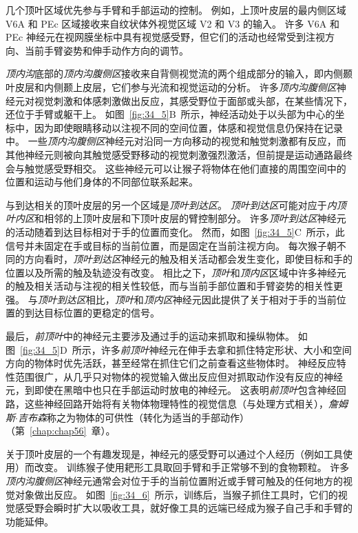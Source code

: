 几个顶叶区域优先参与手臂和手部运动的控制。
例如，上顶叶皮层的最内侧区域 V6A 和 PEc 区域接收来自纹状体外视觉区域 V2 和 V3 的输入。
许多 V6A 和 PEc 神经元在视网膜坐标中具有视觉感受野，但它们的活动也经常受到注视方向、当前手臂姿势和伸手动作方向的调节。


\textit{顶内沟}底部的\textit{顶内沟腹侧区}接收来自背侧视觉流的两个组成部分的输入，即内侧颞叶皮层和内侧颞上皮层，它们参与光流和视觉运动的分析。
许多\textit{顶内沟腹侧区}神经元对视觉刺激和体感刺激做出反应，其感受野位于面部或头部，在某些情况下，还位于手臂或躯干上。
如图~\ref{fig:34_5}B~所示，神经活动处于以头部为中心的坐标中，因为即使眼睛移动以注视不同的空间位置，体感和视觉信息仍保持在记录中。
一些\textit{顶内沟腹侧区}神经元对沿同一方向移动的视觉和触觉刺激都有反应，而其他神经元则被向其触觉感受野移动的视觉刺激强烈激活，但前提是运动通路最终会与触觉感受野相交。
这些神经元可以让猴子将物体在他们直接的周围空间中的位置和运动与他们身体的不同部位联系起来。


与到达相关的顶叶皮层的另一个区域是\textit{顶叶到达区}。
\textit{顶叶到达区}可能对应于\textit{内顶叶内区}和相邻的上顶叶皮层和下顶叶皮层的臂控制部分。
许多\textit{顶叶到达区}神经元的活动随着到达目标相对于手的位置而变化。
然而，如图~\ref{fig:34_5}C~所示，此信号并未固定在手或目标的当前位置，而是固定在当前注视方向。
每次猴子朝不同的方向看时，\textit{顶叶到达区}神经元的触及相关活动都会发生变化，即使目标和手的位置以及所需的触及轨迹没有改变。
相比之下，\textit{顶叶}和\textit{顶内区}区域中许多神经元的触及相关活动与注视的相关性较低，而与当前手部位置和手臂姿势的相关性更强。
与\textit{顶叶到达区}相比，\textit{顶叶}和\textit{顶内区}神经元因此提供了关于相对于手的当前位置的到达目标位置的更稳定的信号。


最后，\textit{前顶叶}中的神经元主要涉及通过手的运动来抓取和操纵物体。
如图~\ref{fig:34_5}D~所示，许多\textit{前顶叶}神经元在伸手去拿和抓住特定形状、大小和空间方向的物体时优先活跃，甚至经常在抓住它们之前查看这些物体时。
神经反应特性范围很广，从几乎只对物体的视觉输入做出反应但对抓取动作没有反应的神经元，到即使在黑暗中也只在手部运动时放电的神经元。
这表明\textit{前顶叶}包含神经回路，这些神经回路开始将有关物体物理特性的视觉信息（与处理方式相关），\textit{詹姆斯$\cdot$吉布森}称之为物体的可供性（转化为适当的手部动作）（第~\ref{chap:chap56}~章）。


关于顶叶皮层的一个有趣发现是，神经元的感受野可以通过个人经历（例如工具使用）而改变。
训练猴子使用耙形工具取回手臂和手正常够不到的食物颗粒。
许多\textit{顶内沟腹侧区}神经元通常会对位于手的当前位置附近或手臂可触及的任何地方的视觉对象做出反应。
如图~\ref{fig:34_6}~所示，训练后，当猴子抓住工具时，它们的视觉感受野会瞬时扩大以吸收工具，就好像工具的远端已经成为猴子自己手和手臂的功能延伸。


